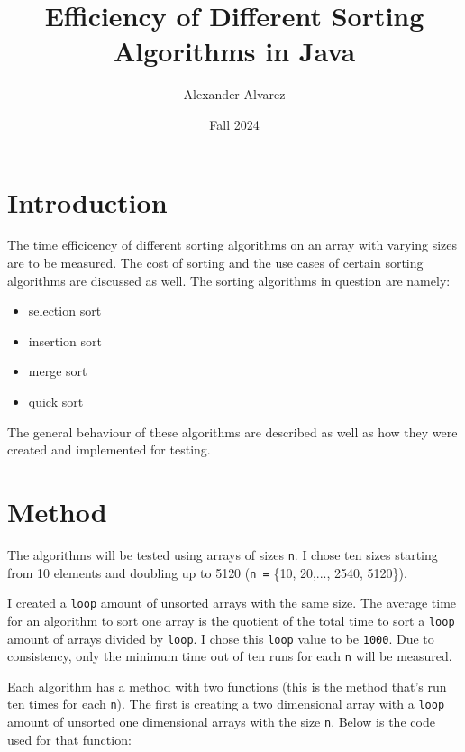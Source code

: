\documentclass[a4paper,11pt]{article}
\begin{document}
\title{
  \textbf{Efficiency of Different Sorting Algorithms in Java}
}
\author{Alexander Alvarez}
\date{Fall 2024}

\maketitle

\section*{Introduction}

The time efficicency of different sorting algorithms on an array with 
varying sizes are to be measured. The cost of sorting and the use cases
of certain sorting algorithms are discussed as well. The sorting 
algorithms in question are namely:

\begin{itemize}
  \item selection sort
  
  \item insertion sort
  
  \item merge sort
  
  \item quick sort
\end{itemize}

The general behaviour of these algorithms are described as well as how 
they were created and implemented for testing.

\section*{Method}

The algorithms will be tested using arrays of sizes {\tt n}. I chose ten 
sizes starting from 10 elements and doubling up to 5120 
({\tt n =} \{10, 20,..., 2540, 5120\}).

I created a {\tt loop} amount of unsorted arrays with the same size. The 
average time for an algorithm to sort one array is the quotient of the 
total time to sort a {\tt loop} amount of arrays divided by {\tt loop}. I 
chose this {\tt loop} value to be {\tt 1000}. Due to consistency, only 
the minimum time out of ten runs for each {\tt n} will be measured.

Each algorithm has a method with two functions (this is the method that's 
run ten times for each {\tt n}). The first is creating a two dimensional 
array with a {\tt loop} amount of unsorted one dimensional arrays with 
the size {\tt n}. Below is the code used for that function:
\end{document}
